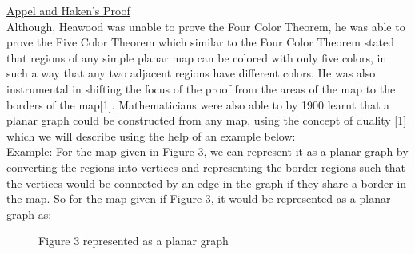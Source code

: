 \documentclass[11pt]{article}
\begin{document}
  
 \noindent \underline{Appel and Haken's Proof}\\
 Although, Heawood was unable to prove the Four Color Theorem, he was able to prove the Five Color Theorem which similar to the Four Color Theorem stated that regions of any simple planar map can be colored with only five colors, in such a way that any two adjacent regions have different colors. He was also instrumental in shifting the focus of the proof from the areas of the map to the borders of the map[1]. Mathematicians were also able to by 1900 learnt that a planar graph could be constructed from any map, using the concept of duality [1] which we will describe using the help of an example below:\\
 Example: For the map given in Figure 3, we can represent it as a planar graph by converting the regions into vertices and representing the border regions such that the vertices would be connected by an edge in the graph if they share a border in the map. So for the map given if Figure 3, it would be represented as a planar graph as: \\
 \begin{figure}[ht!]
\centering
{}
\caption{ Figure 3 represented as a planar graph} 
\end{figure}
 
\end{document}
